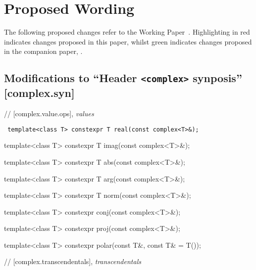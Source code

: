 \documentclass[prd,twocolumn,amsmath,amssymb,nofootinbib,eqsecnum]{revtex4-1}
\newcommand{\code}[1]{{\tt #1}}
\newcommand{\header}[1]{{\tt <#1>}}
\newcommand{\highlight}[1]{{\color{red} #1}}
\begin{document}
\newpage

\onecolumngrid

\section{Proposed Wording}

\setlength{\parindent}{0pt}


The following proposed changes refer to the Working Paper~\cite{WorkingPaper}. Highlighting in red indicates changes proposed in this paper, whilst green indicates changes proposed in the companion paper, \cite{Rosten-constexpr}.



\subsection{Modifications to ``Header \header{complex} synposis'' [complex.syn]}

// [complex.value.ops], {\em values }

\vspace{2ex}

\code{
  	template<class T> constexpr T real(const complex<T>\&);
	
  	template<class T> constexpr T imag(const complex<T>\&);

	\vspace{2ex}

	template<class T> \highlight{constexpr} T abs(const complex<T>\&);
 	
	template<class T> \highlight{constexpr} T arg(const complex<T>\&);
	
	template<class T> constexpr T norm(const complex<T>\&);
	
	\vspace{2ex}
	
	template<class T> constexpr conj(const complex<T>\&);
	
	template<class T> \highlight{constexpr} proj(const complex<T>\&);
	
	template<class T> \highlight{constexpr} polar(const T\&, const T\& = T());	

}

\vspace{2ex}

// [complex.transcendentals], {\em transcendentals}
\end{document}
